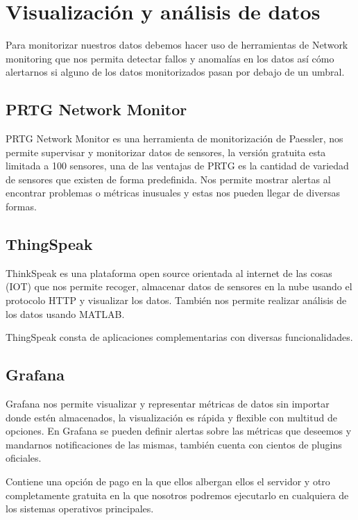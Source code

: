\section{Visualización y análisis de datos}

Para monitorizar nuestros datos debemos hacer uso de herramientas de Network monitoring que nos permita detectar fallos y anomalías en los datos así cómo alertarnos si alguno de los datos monitorizados pasan por debajo de un umbral.

\subsection{PRTG Network Monitor}

PRTG Network Monitor es una herramienta de monitorización de Paessler, nos permite supervisar y monitorizar datos de sensores,  la versión gratuita esta limitada a 100 sensores, una de las ventajas de PRTG es la cantidad de variedad de sensores que existen de forma predefinida. Nos permite mostrar alertas al encontrar problemas o métricas inusuales y estas nos pueden llegar de diversas formas.\cite{pagina:PRTG}

\subsection{ThingSpeak}

ThinkSpeak es una plataforma open source orientada al internet de las cosas (IOT) que nos permite recoger, almacenar datos de sensores en la nube usando el protocolo HTTP y visualizar los datos. También nos permite realizar análisis de los datos usando MATLAB. 

ThingSpeak consta de aplicaciones complementarias con diversas funcionalidades. \cite{pagina:ThingSpeak}

\subsection{Grafana}

Grafana nos permite visualizar y representar métricas de datos sin importar donde estén almacenados, la visualización es rápida y flexible con multitud de opciones. En Grafana se pueden definir alertas sobre las métricas que deseemos y mandarnos notificaciones de las mismas, también cuenta con cientos de plugins oficiales. 

Contiene una opción de pago en la que ellos albergan ellos el servidor y otro completamente gratuita en la que nosotros podremos ejecutarlo en cualquiera de los sistemas operativos principales.\cite{pagina:Grafana}

